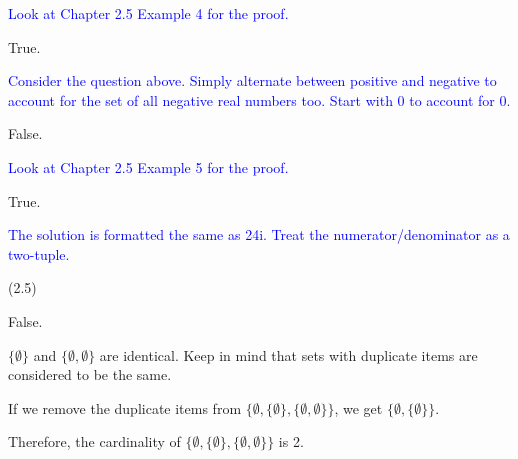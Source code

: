 \documentclass{exam}
\begin{document}
\begin{questions}
\begin{subparts}
\begin{center}
\textcolor{blue}{Look at Chapter 2.5 Example 4 for the proof.}

\end{center}


\begin{center}

True.

\textcolor{blue}{Consider the question above. Simply alternate between positive and negative to account for the set of all negative real numbers too. Start with 0 to account for 0.}

\end{center}


\begin{center}

False.

\textcolor{blue}{Look at Chapter 2.5 Example 5 for the proof.}

\end{center}


\begin{center}

True.

\textcolor{blue}{The solution is formatted the same as 24i. Treat the numerator/denominator as a two-tuple.}

\end{center}

\end{subparts}

 (2.5)

\begin{center}

False.

\( \{\emptyset\} \) and \( \{\emptyset, \emptyset\} \) are identical. Keep in mind that sets with duplicate items are considered to be the same.

If we remove the duplicate items from \( \{\emptyset, \{\emptyset\}, \{\emptyset, \emptyset\}\} \), we get \( \{\emptyset, \{\emptyset\} \}\).

Therefore, the cardinality of \( \{\emptyset, \{\emptyset\}, \{\emptyset, \emptyset\}\} \) is 2.

\end{center}



\end{questions}
\end{document}
